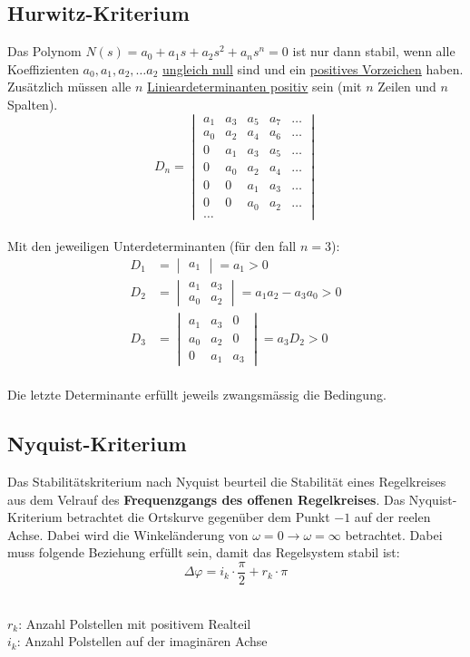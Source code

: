 \subsection{Hurwitz-Kriterium}
Das Polynom $N(s) = a_0 + a_1s + a_2s^2 + a_ns^n = 0$ ist nur dann stabil, 
wenn alle Koeffizienten $a_0, a_1, a_2, \ldots a_2$ \uline{ungleich null} sind und
ein \uline{positives Vorzeichen} haben. Zusätzlich müssen alle $n$ \uline{Linieardeterminanten positiv} sein (mit $n$ Zeilen und $n$ Spalten).  
\[
	D_n = \begin{vmatrix}
	a_1 & a_3 & a_5 & a_7 & \ldots \\ 
	a_0 & a_2 & a_4 & a_6 & \ldots \\ 
	0 & a_1 & a_3 & a_5 & \ldots \\ 
	0 & a_0 & a_2 & a_4 & \ldots \\ 
	0 & 0 & a_1 & a_3 & \ldots \\ 
	0 & 0 & a_0 & a_2 & \ldots \\
	\ldots
	\end{vmatrix} 
\]\\
Mit den jeweiligen Unterdeterminanten (für den fall $n=3$):\\
\[\begin{aligned}
	D_1 &= \begin{vmatrix}
		a_1 
		\end{vmatrix} = a_1 > 0\\
	D_2 &= \begin{vmatrix}
		a_1 & a_3 \\
		a_0 & a_2
	\end{vmatrix} = a_1a_2 - a_3a_0 > 0\\
	D_3 &= \begin{vmatrix}
		a_1 & a_3 & 0\\
		a_0 & a_2 & 0\\
		0	& a_1 & a_3
	\end{vmatrix} = a_3 D_2 > 0
\end{aligned}\]\\
Die letzte Determinante erfüllt jeweils zwangsmässig die Bedingung.

\subsection{Nyquist-Kriterium}
Das Stabilitätskriterium nach Nyquist beurteil die Stabilität eines Regelkreises aus dem Velrauf des \textbf{Frequenzgangs des offenen Regelkreises}.
Das Nyquist-Kriterium betrachtet die Ortskurve gegenüber dem Punkt $-1$ auf der reelen Achse. Dabei wird die Winkeländerung von $\omega = 0 \rightarrow \omega = \infty$ betrachtet. Dabei muss folgende Beziehung erfüllt sein, damit das Regelsystem stabil ist:
\[
	\Delta \varphi = i_k \cdot \frac{\pi}{2} + r_k \cdot \pi
\]\\
\begin{footnotesize}
	$r_k$: Anzahl Polstellen mit positivem Realteil\\
	$i_k$: Anzahl Polstellen auf der imaginären Achse
\end{footnotesize}

